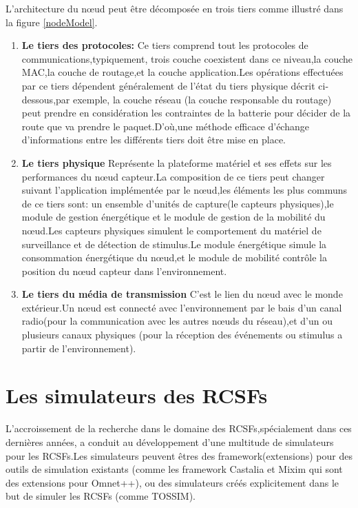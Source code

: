 L'architecture du nœud peut être décomposée en trois tiers comme illustré dans la figure \ref{nodeModel}.
\begin{enumerate}
\item \textbf{Le tiers des protocoles:} 
Ce tiers comprend tout les protocoles de communications,typiquement,
trois couche coexistent dans ce niveau,la couche MAC,la couche de routage,et la couche application.Les opérations effectuées par ce tiers dépendent généralement de l'état du tiers physique décrit ci-dessous,par exemple, la couche réseau (la couche responsable du routage) peut prendre en considération les contraintes de la batterie pour décider de la route que va prendre le paquet.D'où,une méthode efficace d'échange d'informations entre les différents tiers doit être mise en place. 
\item\textbf{Le tiers physique}
Représente la plateforme matériel et ses effets sur les performances du nœud capteur.La composition de ce tiers peut changer suivant l'application implémentée par le nœud,les éléments les plus communs de ce tiers sont: un ensemble d'unités de capture(le capteurs physiques),le module de gestion énergétique et le module de gestion de la mobilité du nœud.Les capteurs physiques simulent le comportement du matériel de surveillance et de détection de stimulus.Le module énergétique simule la consommation énergétique du nœud,et le module de mobilité contrôle la position du nœud capteur dans l'environnement.
\item\textbf{Le tiers du média de transmission}
C'est le lien du nœud avec le monde extérieur.Un nœud est connecté avec l'environnement par le bais d'un canal radio(pour la communication avec les autres nœuds du réseau),et d'un ou plusieurs canaux physiques (pour la réception des événements ou stimulus a partir de l'environnement).
\end{enumerate}


\section{Les simulateurs des RCSFs}

L'accroissement de la recherche dans le domaine des RCSFs,spécialement dans ces dernières années, a conduit au développement d'une multitude de simulateurs pour les RCSFs.Les simulateurs peuvent êtres des framework(extensions) pour des outils de simulation existants (comme les framework Castalia et Mixim qui sont des extensions pour Omnet++), ou des simulateurs créés explicitement dans le but de simuler les RCSFs (comme TOSSIM).


